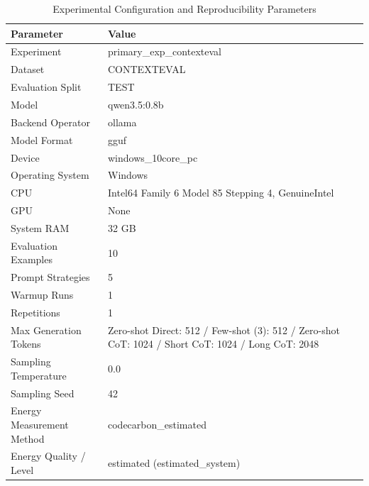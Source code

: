 \begin{table}
\caption{Experimental Configuration and Reproducibility Parameters}
\label{tab:experimental_configuration}
\begin{tabular}{ll}
\toprule
Parameter & Value \\
\midrule
Experiment & primary\_exp\_contexteval \\
Dataset & CONTEXTEVAL \\
Evaluation Split & TEST \\
Model & qwen3.5:0.8b \\
Backend Operator & ollama \\
Model Format & gguf \\
Device & windows\_10core\_pc \\
Operating System & Windows \\
CPU & Intel64 Family 6 Model 85 Stepping 4, GenuineIntel \\
GPU & None \\
System RAM & 32 GB \\
Evaluation Examples & 10 \\
Prompt Strategies & 5 \\
Warmup Runs & 1 \\
Repetitions & 1 \\
Max Generation Tokens & Zero-shot Direct: 512 / Few-shot (3): 512 / Zero-shot CoT: 1024 / Short CoT: 1024 / Long CoT: 2048 \\
Sampling Temperature & 0.0 \\
Sampling Seed & 42 \\
Energy Measurement Method & codecarbon\_estimated \\
Energy Quality / Level & estimated (estimated\_system) \\
\bottomrule
\end{tabular}
\end{table}
